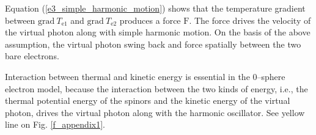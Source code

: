 \documentclass[%
 reprint,
 amsmath,amssymb,
 aps,
]{revtex4-1}
\numberwithin{equation}{section}%
\begin{document}
    Equation (\ref{e3_simple_harmonic_motion}) shows that the temperature gradient between $\mathrm{grad} \ T_{\mathrm{e1}}$ and $\mathrm{grad} \ T_{\mathrm{e2}}$ produces a force $\bm{\mathrm{F}}$. The force drives the velocity of the virtual photon along with simple harmonic motion. On the basis of the above assumption, the virtual photon swing back and force spatially between the two bare electrons.
    
    Interaction between thermal and kinetic energy is essential in the 0--sphere electron model, because the interaction between the two kinds of energy, i.e., the thermal potential energy of the spinors and the kinetic energy of the virtual photon, drives the virtual photon along with the harmonic oscillator. See yellow line on Fig. \ref{f_appendix1}.
\end{document}
